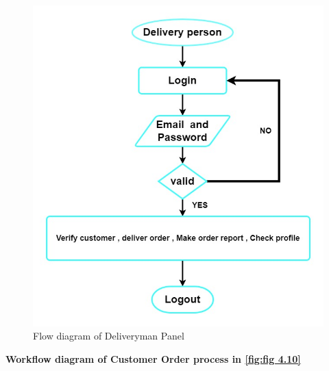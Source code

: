 \begin{figure}[ht]
    \centering  
    \includegraphics[width=\linewidth, height=0.7\textheight]{update_diagram/delivery person flow diagram.jpg}    
    \caption{Flow diagram of Deliveryman Panel}
    \label{fig:fig 4.9}
\end{figure}
\newpage
\textbf{Workflow diagram of Customer Order process in \ref{fig:fig 4.10}}\\

